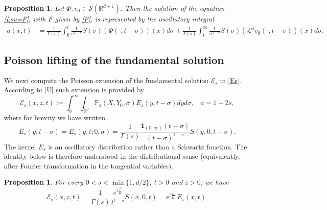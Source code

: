 \documentclass[11pt,letter]{amsart}
\def \RNu {\mathbb{R}^{d+1}}
\def \G{\Gamma}
\newcommand{\Rd}{\mathbb R^d}
\numberwithin{equation}{section}
\newcommand{\Le}{\mathcal L}
\newtheorem{proposition}[theorem]{Proposition}
\numberwithin{equation}{section}
\begin{document}
\begin{proposition}\label{P:fsLs}
Let $\Phi, v_0\in \mathscr S(\RNu)$. Then the solution of the equation \eqref{Lsu=F}, with $F$ given by \eqref{F}, is represented by the oscillatory integral
\begin{align}\label{pot2}
u(x,t) & = \frac{1}{\G(s)} \int_0^t \frac{1}{\sigma^{1-s}} S(\sigma)(\Phi(\cdot,t-\sigma))(x) d\sigma
+ \frac{1}{\G(s)} \int_{t}^\infty \frac{1}{\sigma^{1-s}} S(\sigma)(\Le^s v_0(\cdot,t-\sigma))(x)  d\sigma.
\end{align}
\end{proposition}

\subsection{Poisson lifting of the fundamental solution}\label{P:liftingEs}

We next compute the Poisson extension of the fundamental solution $\mathscr E_s$ in \eqref{Es}. According to \eqref{U} such extension is provided by
\begin{equation}\label{EEs}
\mathscr  E_s(x,z,t) := \int_0^\infty \int_{\Rd} \mathbb P_a(X,Y_0,\sigma) E_s(y,t-\sigma) dy d\sigma,\ \ \ \ a=1-2s,
\end{equation}
where for brevity we have written 
\[
E_s(y,t-\sigma) = E_s(y,t;0,\sigma) = \frac{1}{\G(s)} \frac{\mathbf 1_{(0,\infty)}(t-\sigma)}{(t-\sigma)^{1-s}}  S(y,0,t-\sigma). 
\]
The kernel $E_s$ is an oscillatory distribution rather than a Schwartz function. The identity below is therefore understood in the distributional sense (equivalently, after Fourier transformation in the tangential variables). 

\begin{proposition}\label{P:Es}
For every $0<s<\min\{1,d/2\}$, $t>0$ and $z>0$, we have
\[
\mathscr  E_s(x,z,t) = \frac{1}{\G(s)} \frac{e^{i \frac{z^2}{4t}}}{t^{1-s}} S(x,0,t) = e^{i \frac{z^2}{4t}} \ E_s(x,t).
\]
\end{proposition}
\end{document}
